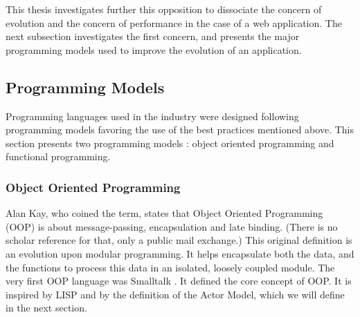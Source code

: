 This thesis investigates further this opposition to dissociate the concern of evolution and the concern of performance in the case of a web application.
The next subsection investigates the first concern, and presents the major programming models used to improve the evolution of an application.

\subsection{Programming Models} \label{chapter3:software-design:programming-models}

Programming languages used in the industry were designed following programming models favoring the use of the best practices mentioned above.
This section presents two programming models : object oriented programming and functional programming.

\subsubsection{Object Oriented Programming}


Alan Kay, who coined the term, states that Object Oriented Programming (OOP) is about message-passing, encapsulation and late binding.
(There is no scholar reference for that, only a public mail exchange.)
This original definition is an evolution upon modular programming.
It helps encapsulate both the data, and the functions to process this data in an isolated, loosely coupled module.
The very first OOP language was Smalltalk \cite{Goldberg1984}.
It defined the core concept of OOP.
It is inspired by LISP and by the definition of the Actor Model, which we will define in the next section.

